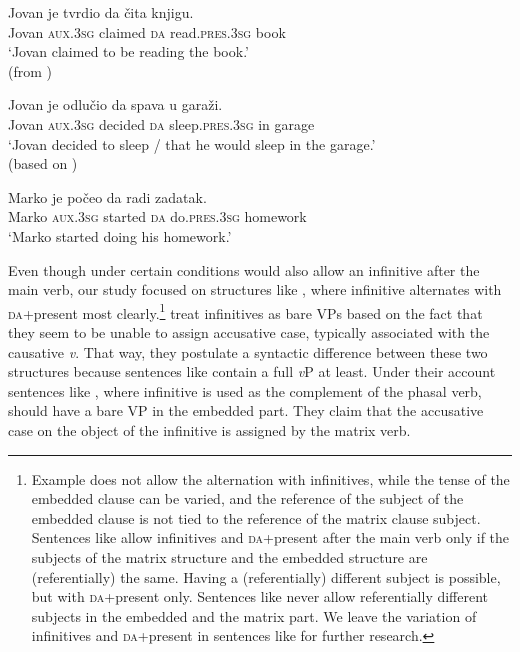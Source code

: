 \documentclass[output=paper,modfonts,newtxmath,hidelinks,]{langscibook}
\begin{document}
\ea \label{7:ex8}
\gll { }Jovan je tvrdio da čita knjigu.\\
     { }Jovan \textsc{aux.3sg} claimed \textsc{da} read.\textsc{pres.3sg} book\\
\glt { }`Jovan claimed to be reading the book.'\\\hfill (from \citealt{TodorovicWurmbrand2015})
\z

\ea \label{7:ex9}
\gll { }Jovan je odlučio da spava u garaži.\\
     { }Jovan \textsc{aux.3sg} decided \textsc{da} sleep.\textsc{pres.3sg} in garage\\
\glt { }`Jovan decided to sleep / that he would sleep in the garage.'\\
\hfill (based on \citealt{TodorovicWurmbrand2015})
\z

\ea \label{7:ex10}
\gll { }Marko je počeo da radi zadatak.\\
     { }Marko \textsc{aux.3sg} started \textsc{da} do.\textsc{pres.3sg} homework\\
\glt { }`Marko started doing his homework.'
\z

\noindent Even though under certain conditions  would also allow an infinitive after the main verb, our study focused on structures like , where infinitive alternates with 
\textsc{da}+present most clearly.\footnote{\label{7:fn3}Example  does not allow the alternation with infinitives, while the tense of the embedded clause can be varied, and the reference of the subject of the embedded clause is not tied to the reference of the matrix clause subject. Sentences like  allow infinitives and \textsc{da}+present after the main verb only if the subjects of the matrix structure and the embedded structure are (referentially) the same. Having a (referentially) different subject is possible, but with \textsc{da}+present only. Sentences like  never allow referentially different subjects in the embedded and the matrix part. We leave the variation of infinitives and \textsc{da}+present in sentences like  for further research.} \citet{TodorovicWurmbrand2015} treat infinitives as bare VPs based on the fact that they seem to be unable to assign accusative case, typically associated with the causative \textit{v}. That way, they postulate a syntactic difference between these two structures because sentences like  contain a full \textit{v}P at least. Under their account sentences like , where infinitive is used as the complement of the phasal verb, should have a bare VP in the embedded part. They claim that the accusative case on the object of the infinitive is assigned by the matrix verb. 
\end{document}
